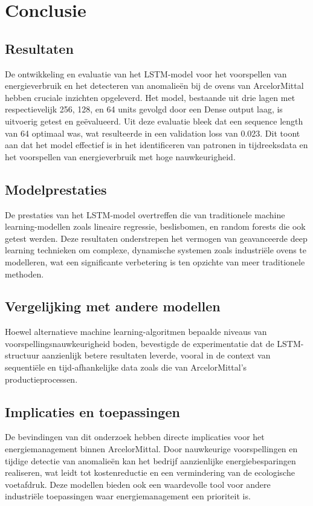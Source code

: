 
\chapter{Conclusie}%
\label{ch:conclusie}

\section{Resultaten}
De ontwikkeling en evaluatie van het LSTM-model voor het voorspellen van energieverbruik en het detecteren van anomalieën bij de ovens van ArcelorMittal hebben cruciale inzichten opgeleverd. Het model, bestaande uit drie lagen met respectievelijk 256, 128, en 64 units gevolgd door een Dense output laag, is uitvoerig getest en geëvalueerd. Uit deze evaluatie bleek dat een sequence length van 64 optimaal was, wat resulteerde in een validation loss van 0.023. Dit toont aan dat het model effectief is in het identificeren van patronen in tijdreeksdata en het voorspellen van energieverbruik met hoge nauwkeurigheid.

\section{Modelprestaties}
De prestaties van het LSTM-model overtreffen die van traditionele machine learning-modellen zoals lineaire regressie, beslisbomen, en random forests die ook getest werden. Deze resultaten onderstrepen het vermogen van geavanceerde deep learning technieken om complexe, dynamische systemen zoals industriële ovens te modelleren, wat een significante verbetering is ten opzichte van meer traditionele methoden.

\section{Vergelijking met andere modellen}
Hoewel alternatieve machine learning-algoritmen bepaalde niveaus van voorspellingsnauwkeurigheid boden, bevestigde de experimentatie dat de LSTM-structuur aanzienlijk betere resultaten leverde, vooral in de context van sequentiële en tijd-afhankelijke data zoals die van ArcelorMittal's productieprocessen.

\section{Implicaties en toepassingen}
De bevindingen van dit onderzoek hebben directe implicaties voor het energiemanagement binnen ArcelorMittal. Door nauwkeurige voorspellingen en tijdige detectie van anomalieën kan het bedrijf aanzienlijke energiebesparingen realiseren, wat leidt tot kostenreductie en een vermindering van de ecologische voetafdruk. Deze modellen bieden ook een waardevolle tool voor andere industriële toepassingen waar energiemanagement een prioriteit is.

